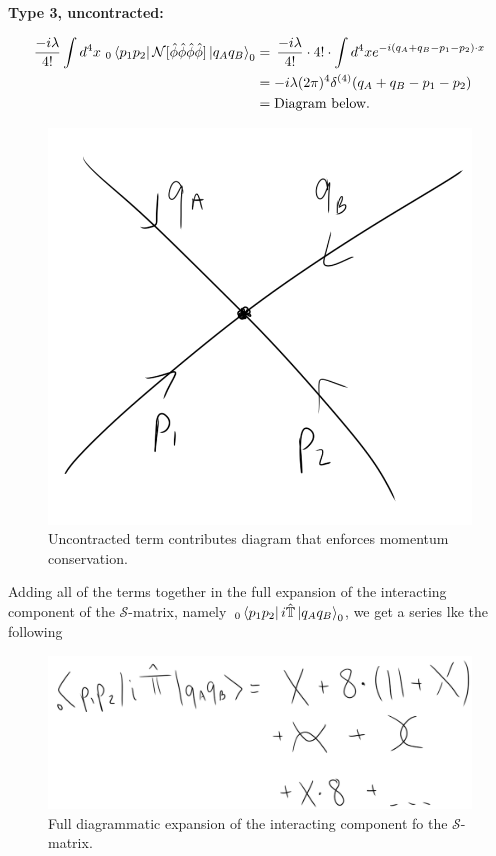\noindent \textbf{Type 3, uncontracted:} 

\begin{align*}
\frac{-i\lambda}{4!} \int d^4 x \,\,_0\bra{p_1 p_2} \mathcal{N}[\hat{\phi} \hat{\phi} \hat{\phi} \hat{\phi}] \ket{q_A q_B}_0 &= \, \frac{-i\lambda}{4!} \cdot 4! \cdot \int d^4 x e^{-i(q_A + q_B - p_1 - p_2) \cdot x} \\
&= -i \lambda (2 \pi)^4 \delta^{(4)} (q_A + q_B - p_1 - p_2) \\
&= \text{Diagram below.}
\end{align*}

\begin{figure}[H]
	\centering
	\includegraphics[scale=0.3]{images/momcons.png}
	\caption{Uncontracted term contributes diagram that enforces momentum conservation.}
\end{figure}

\noindent Adding all of the terms together in the full expansion of the interacting component of the $\mathcal{S}$-matrix, namely $\,_0\bra{p_1 p_2} i\hat{\mathbb{T}} \ket{q_A q_B}_0$, we get a series lke the following

\begin{figure}[H]
	\centering
	\includegraphics[scale=0.4]{images/tmatrix.png}
	\caption{Full diagrammatic expansion of the interacting component fo the $\mathcal{S}$-matrix.}
\end{figure}

